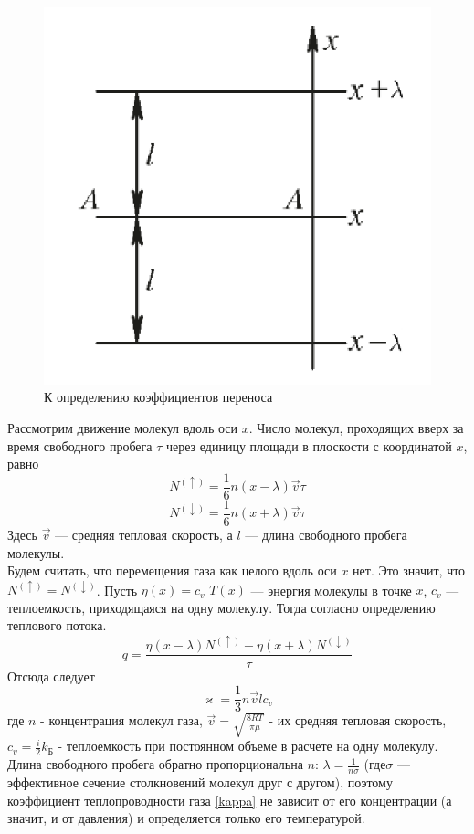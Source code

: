 \documentclass[12pt]{article}
\begin{document}
        \begin{figure}[H]
            \centering
            \includegraphics[width=0.4\linewidth]{furie_image.png}
            \caption{К определению коэффициентов переноса}
            \label{fig:mpr}
        \end{figure}
        Рассмотрим движение молекул вдоль оси $x$. Число молекул, проходящих вверх за время свободного пробега $\tau$ через
        единицу площади в плоскости с координатой $x$, равно
        \[ N^{(\uparrow)} = \frac{1}{6}n(x-\lambda) \vec{v} \tau \]           
        \[ N^{(\downarrow)} = \frac{1}{6}n(x+\lambda) \vec{v} \tau \]
        Здесь $\vec{v}$ — средняя тепловая скорость, а $l$ — длина свободного пробега молекулы.\\
        Будем считать, что перемещения газа как целого вдоль оси $x$ нет. Это значит, что $N^{(\uparrow)} =  N^{(\downarrow)}$.
        Пусть $\eta(x) = c_v$ $T(x)$ — энергия молекулы в точке $x$, $c_v$ — теплоемкость, приходящаяся на одну молекулу. 
        Тогда согласно определению теплового потока.
        \[
            q = \frac{\eta(x-\lambda)N^{(\uparrow)} - \eta(x+\lambda)N^{(\downarrow)}}{\tau}
        \]
        Отсюда следует 
        \begin{equation}\label{kappa}
            \varkappa = \frac{1}{3} n \vec{v}lc_v 
        \end{equation}
        где $n$ - концентрация молекул газа, $\vec{v} = \sqrt{\frac{8RT}{\pi\mu}}$ - их средняя тепловая скорость,
        $c_v = \frac{i}{2}k_{\text{Б}}$ - теплоемкость при постоянном объеме в расчете на одну молекулу.\\
        Длина свободного пробега обратно пропорциональна $n$: $\lambda = \frac{1}{n\sigma}$ (где$\sigma$ — эффективное 
        сечение столкновений молекул друг с другом), поэтому коэффициент теплопроводности газа \ref{kappa} не зависит от его 
        концентрации (а значит, и от давления) и определяется только его температурой.
\end{document}
